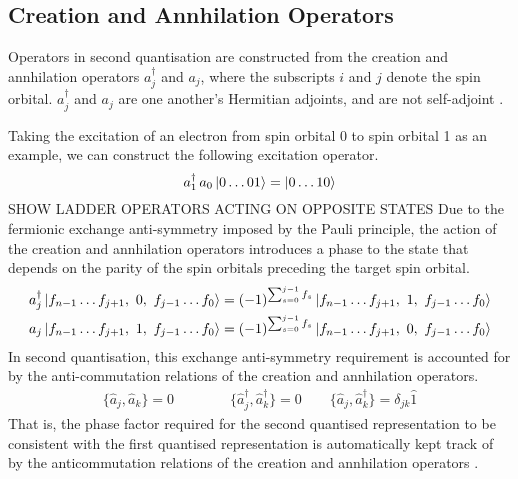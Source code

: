 \subsection{Creation and Annhilation Operators}
Operators in second quantisation are constructed from the creation and annhilation operators $a_j^\dagger$ and $a_j$, where the subscripts $i$ and $j$ denote the spin orbital. $a_j^\dagger$ and $a_j$ are one another's Hermitian adjoints, and are not self-adjoint \cite{Helgaker2000}.

Taking the excitation of an electron from spin orbital 0 to spin orbital 1 as an example, we can construct the following excitation operator.
\begin{equation*}
    a_1^\dagger \, a_0 \ket{0 \dots 01} = \ket{0 \dots 10}
\end{equation*}
SHOW LADDER OPERATORS ACTING ON OPPOSITE STATES
Due to the fermionic exchange anti-symmetry imposed by the Pauli principle, the action of the creation and annhilation operators introduces a phase to the state that depends on the parity of the spin orbitals preceding the target spin orbital.
\begin{align*}
    a_j^\dagger \ket{f_{n-1} \dots
    f_{j+1},\,\, 0,\,\, f_{j-1} \dots f_0} &=
    (-1)^{\sum_{s=0}^{j-1} f_s}
    \ket{f_{n-1} \dots f_{j+1},\,\, 1,\,\, f_{j-1} \dots f_0} \\
    a_j \ket{f_{n-1} \dots f_{j+1},\,\, 1,\,\, f_{j-1} \dots f_0} &=
    (-1)^{\sum_{s=0}^{j-1} f_s}
    \ket{f_{n-1} \dots f_{j+1},\,\, 0,\,\, f_{j-1} \dots f_0}
\end{align*}
In second quantisation, this exchange anti-symmetry requirement is accounted for by the anti-commutation relations of the creation and annhilation operators.
\begin{equation}
\begin{gathered}
    \{ \hat a_{j}, \hat a_{k} \} = 0 \qquad \qquad
    \{ \hat a_{j}^{\dagger}, \hat a_{k}^{\dagger} \} = 0 \qquad
    \{ \hat a_{j}, \hat a_{k}^{\dagger} \} = \delta_{jk} \hat{1}
\end{gathered}
\end{equation}
That is, the phase factor required for the second quantised representation to be consistent with the first quantised representation is automatically kept track of by the anticommutation relations of the creation and annhilation operators \cite{Helgaker2000}.

